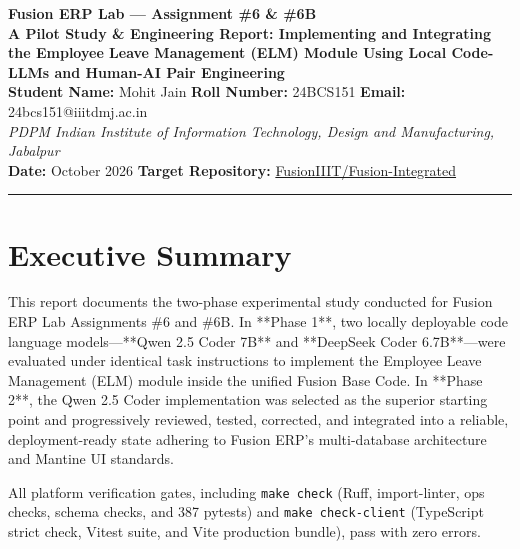 \documentclass[11pt,a4paper]{article}
\begin{document}
\begin{center}
    {\LARGE \textbf{\color{fusionnavy} Fusion ERP Lab — Assignment \#6 \& \#6B}}\\[0.4em]
    {\large \textbf{A Pilot Study \& Engineering Report: Implementing and Integrating the Employee Leave Management (ELM) Module Using Local Code-LLMs and Human-AI Pair Engineering}}\\[0.8em]
    \textbf{Student Name:} Mohit Jain \quad\textbar\quad \textbf{Roll Number:} 24BCS151 \quad\textbar\quad \textbf{Email:} 24bcs151@iiitdmj.ac.in\\
    \textit{PDPM Indian Institute of Information Technology, Design and Manufacturing, Jabalpur}\\[0.4em]
    \textbf{Date:} October 2026 \quad\textbar\quad \textbf{Target Repository:} \href{https://github.com/FusionIIIT/Fusion-Integrated}{FusionIIIT/Fusion-Integrated}
\end{center}
\vspace{-0.5em}
\hrule
\vspace{1.2em}

\section{Executive Summary}
This report documents the two-phase experimental study conducted for Fusion ERP Lab Assignments \#6 and \#6B. In **Phase 1**, two locally deployable code language models—**Qwen 2.5 Coder 7B** and **DeepSeek Coder 6.7B**—were evaluated under identical task instructions to implement the Employee Leave Management (ELM) module inside the unified Fusion Base Code. In **Phase 2**, the Qwen 2.5 Coder implementation was selected as the superior starting point and progressively reviewed, tested, corrected, and integrated into a reliable, deployment-ready state adhering to Fusion ERP's multi-database architecture and Mantine UI standards.

All platform verification gates, including \texttt{make check} (Ruff, import-linter, ops checks, schema checks, and 387 pytests) and \texttt{make check-client} (TypeScript strict check, Vitest suite, and Vite production bundle), pass with zero errors.
\end{document}
